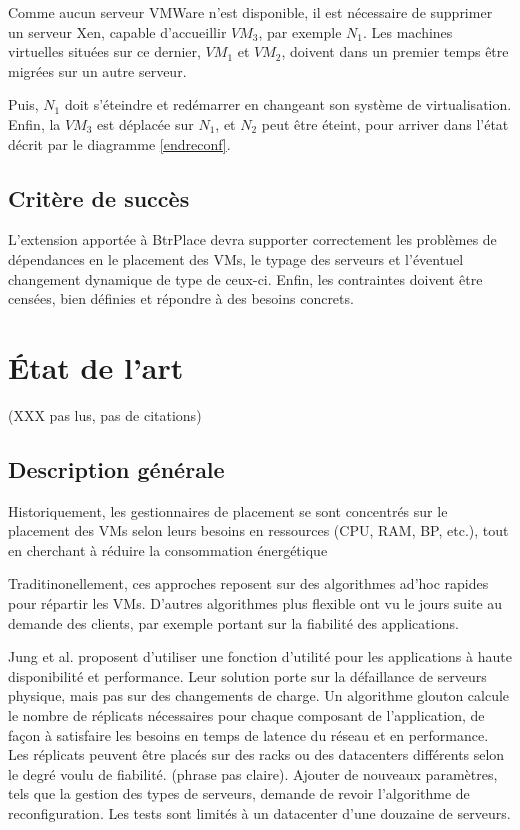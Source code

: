 \documentclass[a4paper]{article}
\begin{document}
Comme aucun serveur VMWare n'est disponible, il est nécessaire de supprimer
un serveur Xen, capable d'accueillir $VM_3$, par exemple $N_1$. Les machines
virtuelles situées sur ce dernier, $VM_1$ et $VM_2$,  doivent dans un premier
temps être migrées sur un autre serveur.

Puis, $N_1$ doit s'éteindre et redémarrer en changeant son système
de virtualisation. Enfin, la $VM_3$ est déplacée sur $N_1$, et $N_2$ peut
être éteint, pour arriver dans l'état décrit par le diagramme \ref{endreconf}.

\subsection{Critère de succès}
L'extension apportée à BtrPlace devra supporter correctement les problèmes
de dépendances en le placement des VMs, le typage des serveurs et l'éventuel
changement dynamique de type de ceux-ci. Enfin, les contraintes doivent être
censées, bien définies et répondre à des besoins concrets.

\section{État de l'art}
(XXX pas lus, pas de citations)
\subsection{Description générale}
Historiquement, les gestionnaires de placement se sont concentrés sur
le placement des VMs selon leurs besoins en ressources (CPU, RAM, BP, etc.),
tout en cherchant à réduire la consommation énergétique

Traditinonellement, ces approches reposent sur des algorithmes ad'hoc rapides
pour répartir les VMs. D'autres algorithmes plus flexible ont vu le jours
suite au demande des clients, par exemple portant sur la fiabilité des
applications.

Jung et al. proposent d'utiliser une fonction d'utilité pour les
applications à haute disponibilité et performance. Leur solution
porte sur la défaillance de serveurs physique, mais pas sur des
changements de charge. Un algorithme glouton calcule le nombre de
réplicats nécessaires pour chaque composant de l'application, de
façon à satisfaire les besoins en temps de latence du réseau et
en performance. Les réplicats peuvent être placés sur des racks
ou des datacenters différents selon le degré voulu de fiabilité.
(phrase pas claire). Ajouter de nouveaux paramètres, tels que la
gestion des types de serveurs, demande de revoir l'algorithme
de reconfiguration. Les tests sont limités à un datacenter d'une
douzaine de serveurs.
\end{document}
